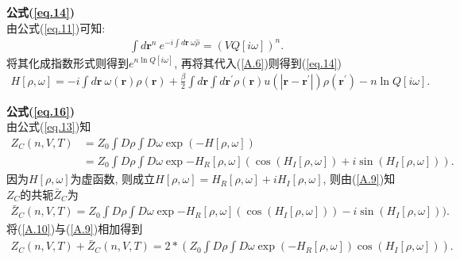 \par
\textbf{公式(\ref{eq.14})}
\\
由公式(\ref{eq.11})可知:
\begin{equation}
    \begin{aligned}
        \int d\bm{r}^{n}\ e^{-i\int d\bm{r}\ \omega\hat{\rho}}=(VQ[i\omega])^{n}.
    \end{aligned}
    \label{A.7}
\end{equation}
将其化成指数形式则得到$e^{n\ln Q[i\omega]}$,
再将其代入(\ref{A.6})则得到(\ref{eq.14})
 \begin{equation}
       \begin{aligned}
           H[\rho, \omega]=-i\int d\bm{r}\ 
           \omega(\bm{r})\rho(\bm{r})+\frac{\beta}{2}\int d\bm{r} \int
           d\bm{r^{'}} \rho(\bm{r})u(|\bm{r}-\bm{r^{'}}|)\rho(\bm{r^{'}})-n\ln Q[i\omega].
    \end{aligned}
       \label{A.8}
    \end{equation}
\par
\textbf{公式(\ref{eq.16})}
\\
由公式(\ref{eq.13})知
   \begin{equation}
       \begin{aligned}
           Z_C(n, V, T)&=Z_0\int D\rho \int D\omega \exp(-H[\rho, \omega])
                       \\
                       &=Z_0\int D\rho \int D\omega \exp{-H_{R}[\rho,
           \omega]}(\cos(H_{I}[\rho, \omega])+i\sin(H_{I}[\rho, \omega])).
    \end{aligned}
       \label{A.9}
    \end{equation}
因为$H[\rho, \omega]$为虚函数, 则成立$H[\rho, \omega]=H_{R}[\rho,
\omega]+iH_{I}[\rho, \omega]$, 则由(\ref{A.9})知$Z_{C}$的共轭$\bar{Z}_{C}$为
   \begin{equation}
       \begin{aligned}
           \bar{Z}_C(n, V, T)=Z_0\int D\rho \int D\omega \exp{-H_{R}[\rho,
           \omega]}(\cos(H_{I}[\rho, \omega]))-i\sin(H_{I}[\rho, \omega])).
    \end{aligned}
       \label{A.10}
    \end{equation}
将(\ref{A.10})与(\ref{A.9})相加得到
   \begin{equation}
       \begin{aligned}
           Z_C(n, V, T)+\bar{Z}_{C}(n, V, T)=2*(Z_0\int D\rho \int D\omega
           \exp(-H_{R}[\rho, \omega])\cos(H_{I}[\rho, \omega])).
    \end{aligned}
       \label{A.11}
    \end{equation}
